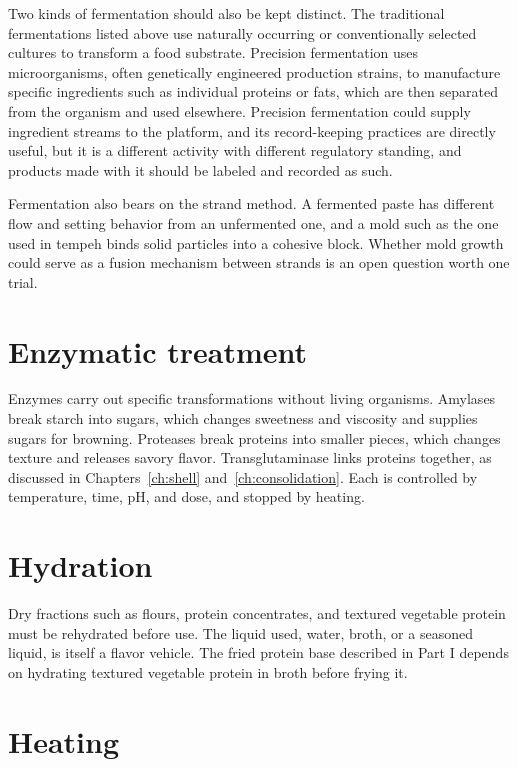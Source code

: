 \documentclass[11pt,openany]{book}
\theoremstyle{definition}
\begin{document}
Two kinds of fermentation should also be kept distinct. The traditional fermentations listed above use naturally occurring or conventionally selected cultures to transform a food substrate. Precision fermentation uses microorganisms, often genetically engineered production strains, to manufacture specific ingredients such as individual proteins or fats, which are then separated from the organism and used elsewhere. Precision fermentation could supply ingredient streams to the platform, and its record-keeping practices are directly useful, but it is a different activity with different regulatory standing, and products made with it should be labeled and recorded as such.

Fermentation also bears on the strand method. A fermented paste has different flow and setting behavior from an unfermented one, and a mold such as the one used in tempeh binds solid particles into a cohesive block. Whether mold growth could serve as a fusion mechanism between strands is an open question worth one trial.

\section{Enzymatic treatment}

Enzymes carry out specific transformations without living organisms. Amylases break starch into sugars, which changes sweetness and viscosity and supplies sugars for browning. Proteases break proteins into smaller pieces, which changes texture and releases savory flavor. Transglutaminase links proteins together, as discussed in Chapters~\ref{ch:shell} and~\ref{ch:consolidation}. Each is controlled by temperature, time, pH, and dose, and stopped by heating.

\section{Hydration}

Dry fractions such as flours, protein concentrates, and textured vegetable protein must be rehydrated before use. The liquid used, water, broth, or a seasoned liquid, is itself a flavor vehicle. The fried protein base described in Part I depends on hydrating textured vegetable protein in broth before frying it.

\section{Heating}
\end{document}
